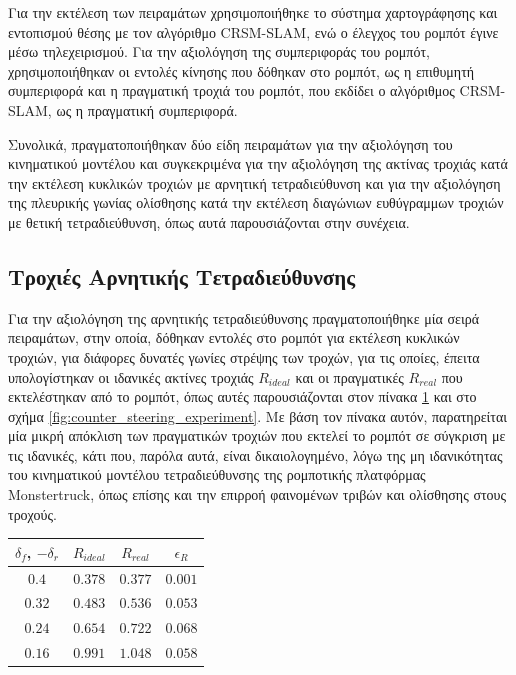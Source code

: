 \bigskip
Για την εκτέλεση των πειραμάτων χρησιμοποιήθηκε το σύστημα χαρτογράφησης και εντοπισμού θέσης με τον αλγόριθμο CRSM-SLAM, ενώ ο έλεγχος του ρομπότ έγινε μέσω τηλεχειρισμού. Για την αξιολόγηση της συμπεριφοράς του ρομπότ, χρησιμοποιήθηκαν οι εντολές κίνησης που δόθηκαν στο ρομπότ, ως η επιθυμητή συμπεριφορά και η πραγματική τροχιά του ρομπότ, που εκδίδει ο αλγόριθμος CRSM-SLAM, ως η πραγματική συμπεριφορά.

\bigskip
Συνολικά, πραγματοποιήθηκαν δύο είδη πειραμάτων για την αξιολόγηση του κινηματικού μοντέλου και συγκεκριμένα για την αξιολόγηση της ακτίνας τροχιάς κατά την εκτέλεση κυκλικών τροχιών με αρνητική τετραδιεύθυνση και για την αξιολόγηση της πλευρικής γωνίας ολίσθησης κατά την εκτέλεση διαγώνιων ευθύγραμμων τροχιών με θετική τετραδιεύθυνση, όπως αυτά παρουσιάζονται στην συνέχεια.

\subsection{Τροχιές Αρνητικής Τετραδιεύθυνσης}
Για την αξιολόγηση της αρνητικής τετραδιεύθυνσης πραγματοποιήθηκε μία σειρά πειραμάτων, στην οποία, δόθηκαν εντολές στο ρομπότ για εκτέλεση κυκλικών τροχιών, για διάφορες δυνατές γωνίες στρέψης των τροχών, για τις οποίες, έπειτα υπολογίστηκαν οι ιδανικές ακτίνες τροχιάς $R_{ideal}$ και οι πραγματικές $R_{real}$ που εκτελέστηκαν από το ρομπότ, όπως αυτές παρουσιάζονται στον πίνακα \ref{tab:counter_steering_experiment} και στο σχήμα \ref{fig:counter_steering_experiment}. Με βάση τον πίνακα αυτόν, παρατηρείται μία μικρή απόκλιση των πραγματικών τροχιών που εκτελεί το ρομπότ σε σύγκριση με τις ιδανικές, κάτι που, παρόλα αυτά, είναι δικαιολογημένο, λόγω της μη ιδανικότητας του κινηματικού μοντέλου τετραδιεύθυνσης της ρομποτικής πλατφόρμας Monstertruck, όπως επίσης και την επιρροή φαινομένων τριβών και ολίσθησης στους τροχούς.
 
\begin{table}[!ht]
	\centering
	\label{tab:counter_steering_experiment}
	\begin{tabular}{c | c |  c | c}
	 	\textbf{$\delta_f$}, \textbf{$-\delta_r$} & \textbf{$R_{ideal}$} & \textbf{$R_{real}$} & \textbf{${\epsilon}_R$} \\ \hline
	   $0.4$ & $0.378$ & $0.377$ & $0.001$\\
 	   $0.32$ & $0.483$ & $0.536$ & $0.053$\\
  	   $0.24$ & $0.654$ & $0.722$ & $0.068$\\
   	   $0.16$ & $0.991$ & $1.048$ & $0.058$
   	\end{tabular}
\end{table}

